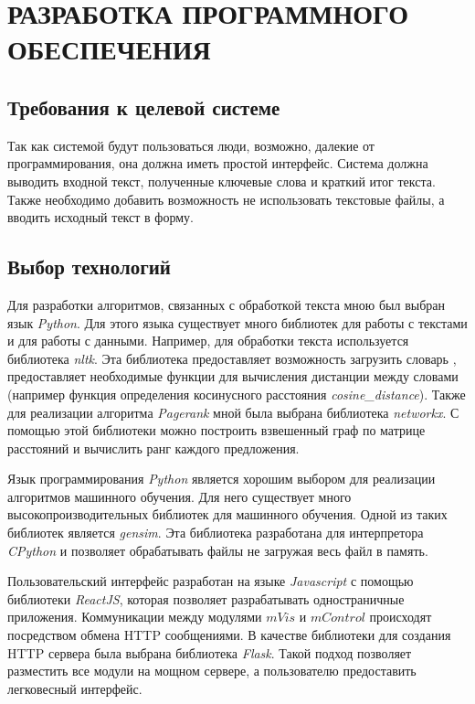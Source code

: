 \chapter{РАЗРАБОТКА ПРОГРАММНОГО ОБЕСПЕЧЕНИЯ}

\section{Требования к целевой системе}

Так как системой будут пользоваться люди, возможно, далекие от программирования, она должна иметь простой интерфейс. Система должна выводить входной текст, полученные ключевые слова и краткий итог текста. Также необходимо добавить возможность не использовать текстовые файлы, а вводить исходный текст в форму.

\section{Выбор технологий}

Для разработки алгоритмов, связанных с обработкой текста мною был выбран язык \textit{Python}. Для этого языка существует много библиотек для работы с текстами и для работы с данными. Например, для обработки текста используется библиотека \textit{nltk}. Эта библиотека предоставляет возможность загрузить словарь , предоставляет необходимые функции для вычисления дистанции между словами (например функция определения косинусного расстояния \textit{cosine\_distance}). Также для реализации алгоритма \textit{Pagerank} мной была выбрана библиотека \textit{networkx}. С помощью этой библиотеки можно построить взвешенный граф по матрице расстояний и вычислить ранг каждого предложения.

Язык программирования \textit{Python} является хорошим выбором для реализации алгоритмов машинного обучения. Для него существует много высокопроизводительных библиотек для машинного обучения. Одной из таких библиотек является \textit{gensim}. Эта библиотека разработана для интерпретора \textit{CPython} и позволяет обрабатывать файлы не загружая весь файл в память.

Пользовательский интерфейс разработан на языке \textit{Javascript} с помощью библиотеки \textit{ReactJS}, которая позволяет разрабатывать одностраничные приложения. Коммуникации между модулями $mVis$ и $mControl$ происходят посредством обмена HTTP сообщениями.
В качестве библиотеки для создания HTTP сервера была выбрана библиотека \textit{Flask}.
Такой подход позволяет разместить все модули на мощном сервере, а пользователю предоставить легковесный интерфейс.

